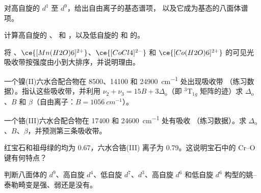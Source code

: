 \begin{exercise}[$\star$]\label{exo:b3:complex-spectra-magnetism:2}
对高自旋的 $d^1$ 至 $d^9$，给出自由离子的基态谱项，
以及它成为基态的八面体谱项。
\end{exercise}

\begin{exercise}[$\star$]\label{exo:b3:complex-spectra-magnetism:3}
计算高自旋的 、 和 ，以及低自旋的
 和  的。
\end{exercise}

\begin{exercise}[$\star$]\label{exo:b3:complex-spectra-magnetism:4}
将 、$\ce{[Mn(H2O)6]^{2+}}$、$\ce{[CoCl4]^{2-}}$ 和
$\ce{[Co(H2O)6]^{2+}}$ 的可见光吸收带按强度由小到大排序，并说明理由。
\end{exercise}

\begin{exercise}[$\star\star$]\label{exo:b3:complex-spectra-magnetism:5}
一个镍(II)六水合配合物在 8500、14100 和 \qty{24900}{cm^{-1}} 处出现吸收带
（练习数据）。指认这些吸收带，并利用
$\nu_2 + \nu_3 = 15B + 3\Delta_{\mathrm o}$（即 $^3$T$_{1g}$ 矩阵的迹）求 $\Delta_{\mathrm o}$、$B$ 和 $\beta$（自由离子：$B = \qty{1056}{cm^{-1}}$）。
\end{exercise}

\begin{exercise}[$\star\star$]\label{exo:b3:complex-spectra-magnetism:6}
一个铬(III)六水合配合物在 17400 和 \qty{24600}{cm^{-1}} 处有吸收
（练习数据）。求 $\Delta_{\mathrm o}$、$B$、$\beta$，并预测第三条吸收带。
\end{exercise}

\begin{exercise}[$\star\star$]\label{exo:b3:complex-spectra-magnetism:7}
红宝石和祖母绿的均为 0.67，六水合铬(III)
离子为 0.79。这说明宝石中的 Cr--O 键有何特点？
\end{exercise}

\begin{exercise}[$\star\star$]\label{exo:b3:complex-spectra-magnetism:8}
判断八面体的 $d^9$、高自旋
$d^4$、低自旋 $d^7$、$d^3$、高自旋 $d^6$ 和低自旋 $d^6$ 构型的姚–泰勒畸变是强、弱还是没有。
\end{exercise}

